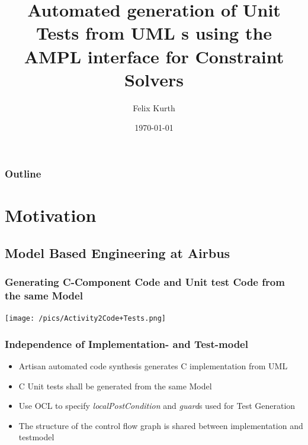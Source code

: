 \documentclass{beamer}
\title[Automated Unit Test Generation]{Automated generation of Unit Tests from UML \UMLType{Activity}s using the AMPL interface for Constraint Solvers }
\author[F. Kurth]{Felix Kurth}
\date[\today]{\today}
\begin{document}
\begin{frame}
\titlepage
\end{frame}

\begin{frame}
\frametitle{Outline} 
\tableofcontents  
\end{frame}


\section{Motivation}

\subsection{Model Based Engineering at Airbus}
\begin{frame}
\frametitle{Generating C-Component Code and Unit test Code from the same Model}
\texttt{[image: /pics/Activity2Code+Tests.png]}
\end{frame}

\begin{frame}
\frametitle{Independence of Implementation- and Test-model} 
\begin{itemize} 
\item Artisan automated code synthesis generates C implementation from UML 
\item C Unit tests shall be generated from the same Model
\item Use OCL to specify \emph{localPostCondition} and \emph{guard}s used for Test Generation
\item The structure of the control flow graph is shared between implementation and testmodel
\end{itemize}
\end{frame} 



\end{document}
